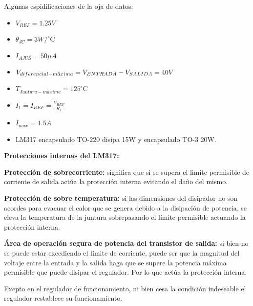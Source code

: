 \sangria{} Algunas espidificaciones de la oja de datos:


\begin{itemize}
    \item $V_{REF}=1.25V$
    \item $\theta_{JC} = 3 W/ ^\circ\mathrm{C} $
    \item $I_{AJUS} = 50\mu A$
    \item $V_{diferencial-m \tilde{a} xima}=\\V_{ENTRADA}-V_{SALIDA}=40V$
    \item $T_{Juntura-m\tilde{a}xima}=125 ^\circ\mathrm{C}$
    \item $I_1=I_{REF}=\frac{V_{REF}}{R_1}$
    \item $I_{max}=1.5A$
    \item LM317 encapsulado TO-220 disipa 15W y encapsulado TO-3 20W.
\end{itemize}

\begin{center}
\textbf{Protecciones internas del LM317:}
\end{center}
\sangria{} \textbf{Protección de sobrecorriente:} significa que si se supera el limite permisible de corriente de salida actúa la protección interna evitando el daño del mismo.

\sangria{} \textbf{Protección de sobre temperatura:} si las dimensiones del disipador no son acordes para evacuar el calor que se genera debido a la disipación de potencia, se eleva la temperatura de la juntura sobrepasando el límite permisible
actuando la protección interna.

\sangria{} \textbf{Área de operación segura de potencia del transistor de salida:} si
bien no se puede estar excediendo el límite de corriente, puede ser que la
magnitud del voltaje entre la entrada y la salida haga que se supere la potencia máxima permisible que puede disipar el regulador. Por lo que actúa la protección interna.

\sangria{} Exepto en el regulador de funcionamiento, ni bien cesa la condición
indeseable el regulador restablece su funcionamiento.

\columnbreak
\text{}